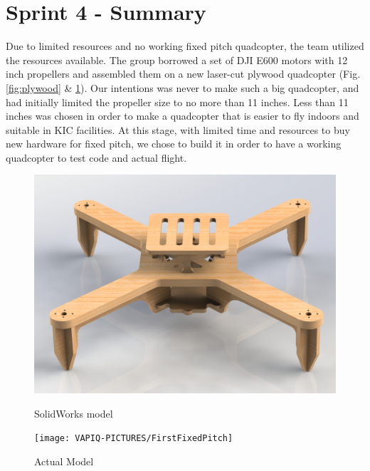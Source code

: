 \newpage
\section{Sprint 4 - Summary}

Due to limited resources and no working fixed pitch quadcopter, the team utilized the resources available. The group borrowed a set of DJI E600 motors with 12 inch propellers and assembled them on a new laser-cut plywood quadcopter (Fig. \ref{fig:plywood} \& \ref{fig:actual}). Our intentions was never to make such a big quadcopter, and had initially limited the propeller size to no more than 11 inches. Less than 11 inches was chosen in order to make a quadcopter that is easier to fly indoors and suitable in KIC facilities. At this stage, with limited time and resources to buy new hardware for fixed pitch, we chose to build it in order to have a working quadcopter to test code and actual flight.

\begin{figure}[h]
        \centering
         \begin{minipage}[b]{0.4\textwidth}
            \includegraphics[width = 1\textwidth]{VAPIQ-PICTURES/FixedPitchRender}
              \caption{SolidWorks model}
            \label{fig:plywood}
        \end{minipage}
        \hfill
        \begin{minipage}[b]{0.4\textwidth}
            \texttt{[image: VAPIQ-PICTURES/FirstFixedPitch]}
            \caption{Actual Model}
            \label{fig:actual}
        \end{minipage}
\end{figure}

